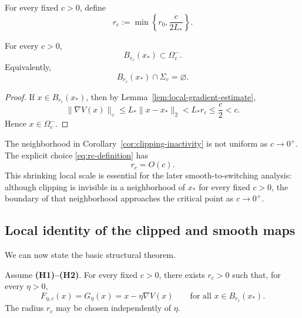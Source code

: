 For every fixed $c>0$, define
\begin{equation}
r_c
:=
\min
\left\{
r_0,
\frac{c}{2L_*}
\right\}.
\label{eq:rc-definition}
\end{equation}

\begin{corollary}
\label{cor:clipping-inactivity}
For every $c>0$,
\begin{equation}
B_{r_c}(x_*)
\subset\Omega_c^-.
\label{eq:ball-inside-smooth-region}
\end{equation}
Equivalently,
\begin{equation}
B_{r_c}(x_*)\cap\Sigma_c
=
\varnothing.
\label{eq:no-switching-near-critical}
\end{equation}
\end{corollary}

\begin{proof}
If $x\in B_{r_c}(x_*)$, then by
Lemma~\ref{lem:local-gradient-estimate},
\[
\|\nabla V(x)\|_\diamond
\leq
L_*\|x-x_*\|_2
<
L_*r_c
\leq
\frac{c}{2}
<
c.
\]
Hence $x\in\Omega_c^-$.
\end{proof}

\begin{remark}
\label{rem:shrinking-neighborhood}
The neighborhood in Corollary~\ref{cor:clipping-inactivity} is not
uniform as $c\to0^+$.  The explicit choice
\eqref{eq:rc-definition} has
\[
r_c=O(c).
\]
This shrinking local scale is essential for the later
smooth-to-switching analysis: although clipping is invisible in a
neighborhood of $x_*$ for every fixed $c>0$, the boundary of that
neighborhood approaches the critical point as $c\to0^+$.
\end{remark}

\subsection{Local identity of the clipped and smooth maps}
\label{subsec:local-identity}

We can now state the basic structural theorem.

\begin{theorem}
\label{thm:local-identity}
Assume \textbf{(H1)--(H2)}. For every fixed $c>0$, there exists
$r_c>0$ such that, for every $\eta>0$,
\begin{equation}
F_{\eta,c}(x)
=
G_\eta(x)
=
x-\eta\nabla V(x)
\qquad
\text{for all }
x\in B_{r_c}(x_*).
\label{eq:local-map-identity}
\end{equation}
The radius $r_c$ may be chosen independently of $\eta$.
\end{theorem}

